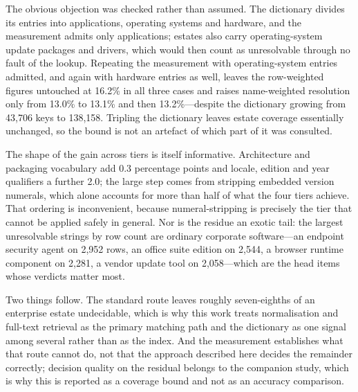 \documentclass[fleqn,10pt,lineno]{wlpeerj}
\begin{document}
The obvious objection was checked rather than assumed. The dictionary divides its entries into applications, operating systems and hardware, and the measurement admits only applications; estates also carry operating-system update packages and drivers, which would then count as unresolvable through no fault of the lookup. Repeating the measurement with operating-system entries admitted, and again with hardware entries as well, leaves the row-weighted figures untouched at 16.2\% in all three cases and raises name-weighted resolution only from 13.0\% to 13.1\% and then 13.2\%---despite the dictionary growing from 43,706 keys to 138,158. Tripling the dictionary leaves estate coverage essentially unchanged, so the bound is not an artefact of which part of it was consulted.

The shape of the gain across tiers is itself informative. Architecture and packaging vocabulary add 0.3 percentage points and locale, edition and year qualifiers a further 2.0; the large step comes from stripping embedded version numerals, which alone accounts for more than half of what the four tiers achieve. That ordering is inconvenient, because numeral-stripping is precisely the tier that cannot be applied safely in general. Nor is the residue an exotic tail: the largest unresolvable strings by row count are ordinary corporate software---an endpoint security agent on 2,952 rows, an office suite edition on 2,544, a browser runtime component on 2,281, a vendor update tool on 2,058---which are the head items whose verdicts matter most.

Two things follow. The standard route leaves roughly seven-eighths of an enterprise estate undecidable, which is why this work treats normalisation and full-text retrieval as the primary matching path and the dictionary as one signal among several rather than as the index. And the measurement establishes what that route cannot do, not that the approach described here decides the remainder correctly; decision quality on the residual belongs to the companion study, which is why this is reported as a coverage bound and not as an accuracy comparison.
\end{document}
